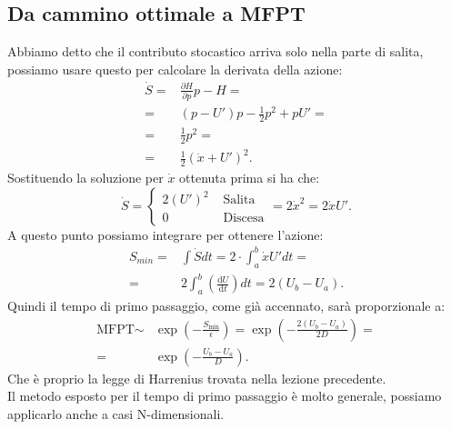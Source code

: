 \subsection{Da cammino ottimale a MFPT}%
\label{sub:Da cammino ottimale a MFPT}
Abbiamo detto che il contributo stocastico arriva solo nella parte di salita, possiamo usare questo per calcolare la derivata della azione:
\begin{equation}
\begin{aligned}
    \dot{S} =& \frac{\partial H}{\partial p} p - H = \\
            =& \left(p-U'\right)p - \frac{1}{2}p^2+pU' = \\
	    =& \frac{1}{2}p^2 = \\
	    =& \frac{1}{2}\left(\dot{x}+U'\right)^2
.\end{aligned}
\label{eq:12_action}
\end{equation}
Sostituendo la soluzione per $\dot{x}$ ottenuta prima si ha che:
\[
    \dot{S} = 
    \begin{cases}
	2(U') ^2 & \text{ Salita}\\
	0        & \text{ Discesa}
    \end{cases}
    = 2 \dot{x}^2 = 2\dot{x}U'
.\] 
A questo punto possiamo integrare per ottenere l'azione:
\[\begin{aligned}
    S_{min} =& \int\dot{S}dt = 
             2\cdot \int_{a}^{b} \dot{x}U'dt = \\
            =& 2  \int_{a}^{b} \left(\frac{\text{d} U}{\text{d} t} \right)dt =
	     2(U_b-U_a)  
.\end{aligned}\]
Quindi il tempo di primo passaggio, come già accennato, sarà proporzionale a:
\[\begin{aligned}
    \text{MFPT} \sim& \exp\left(-\frac{S_{\text{min}}}{\epsilon}\right) =
    \exp\left(-\frac{2(U_b-U_a)}{2D}\right) =\\
    =&\exp\left(-\frac{U_b-U_a}{D}\right)
.\end{aligned}\]
Che è proprio la legge di Harrenius trovata nella lezione precedente.\\
Il metodo esposto per il tempo di primo passaggio è molto generale, possiamo applicarlo anche a casi N-dimensionali.

